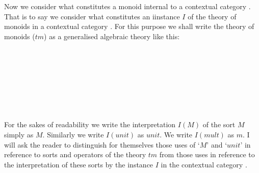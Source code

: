
\note
Now we consider what constitutes a monoid internal to a contextual category \catc. That is to say 
we consider what constitutes an iinstance $I$ of the theory of monoids   in a contextual category \catc.
For this purpose we shall write the theory of monoids ($tm$) as a generalised algebraic theory like this: 
\begin{gatrules}
\gatintros
{}
 \\
 \\
 \\
\gataxioms

\begin{gatgroup}{}
 \\
\end{gatgroup} \\
\end{gatrules}
\note 
For the sakes of readability we write the interpretation $I(M)$ of the sort $M$ simply as $M$. Similarly we write $I(unit)$ as $unit$. We write $I(mult)$ as $m$. I will ask the reader  to distinguish for themselves 
those uses of `$M$' and `$unit$' in reference to sorts and operators of the theory $tm$ from those uses in reference to the interpretation of these sorts by the instance $I$ in the contextual category \catc. 

\newcommand{\wM}{\ofT{w}{M}}
\newcommand{\xM}{\ofT{x_1, x_2}{M}}
\newcommand{\yM}{\ofT{y_1, y_2, y_3}{M}}
\newcommand{\doubleM}{M^2}                       %
\newcommand{\trebleM}{M^3}                       %
\newcommand{\quadM}{M^4}                         %
\newcommand{\spi}{s(p_{M^3,M^i})}
\newcommand{\sptrebleone}{s(p_{M^3,M^1})}
\newcommand{\sptrebletwo}{s(p_{M^3,M^2})}
\newcommand{\sptreblethree}{s(p_{M^3,M^3})}
\newcommand{\fmult}{m}  %

